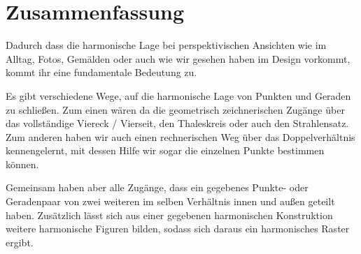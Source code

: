 \documentclass[12pt,a4paper]{article}
\begin{document}

\newpage
\section{Zusammenfassung}

Dadurch dass die harmonische Lage bei perspektivischen Ansichten wie im Alltag, Fotos, Gemälden oder auch wie wir gesehen haben im Design vorkommt, kommt ihr eine fundamentale Bedeutung zu.

Es gibt verschiedene Wege, auf die harmonische Lage von Punkten und Geraden zu schließen. Zum einen wären da die geometrisch zeichnerischen Zugänge über das vollständige Viereck / Vierseit, den Thaleskreis oder auch den Strahlensatz. Zum anderen haben wir auch einen rechnerischen Weg über das Doppelverhältnis kennengelernt, mit dessen Hilfe wir sogar die einzelnen Punkte bestimmen können.

Gemeinsam haben aber alle Zugänge, dass ein gegebenes Punkte- oder Geradenpaar von  zwei weiteren im selben Verhältnis innen und außen geteilt haben. Zusätzlich lässt sich aus einer gegebenen harmonischen Konstruktion weitere harmonische Figuren bilden, sodass sich daraus ein harmonisches Raster ergibt.

\newpage
\listoffigures

\newpage
\nocite{proCG}
\nocite{perspectivesOnProGeo}
\nocite{doppelVerhaeltnis}
\nocite{proGeoGrundlagen}


\end{document}
